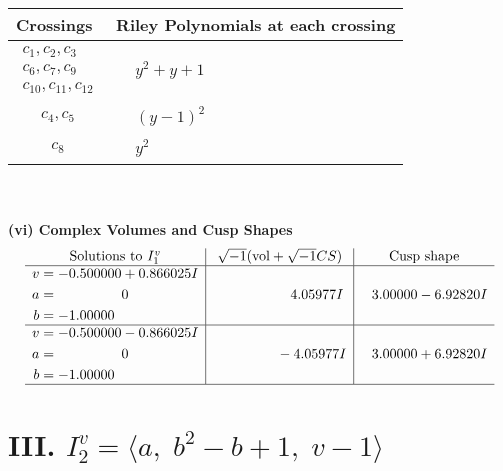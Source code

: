 \documentclass[1p]{elsarticle_modified}
\theoremstyle{definition}
\newcommand{\I}{\sqrt{-1}}
\begin{document}
\begin{tabular}{m{50pt}|m{274pt}}
Crossings & \hspace{64pt}Riley Polynomials at each crossing \\
\hline $$\begin{aligned}c_{1},c_{2},c_{3}\\c_{6},c_{7},c_{9}\\c_{10},c_{11},c_{12}\end{aligned}$$&$\begin{aligned}
&y^2+y+1
\end{aligned}$\\
\hline $$\begin{aligned}c_{4},c_{5}\end{aligned}$$&$\begin{aligned}
&(y-1)^2
\end{aligned}$\\
\hline $$\begin{aligned}c_{8}\end{aligned}$$&$\begin{aligned}
&y^2
\end{aligned}$\\
\hline
\end{tabular}\\~\\
\newpage\flushleft \textbf{(vi) Complex Volumes and Cusp Shapes}
$$\begin{array}{c|c|c}  
\text{Solutions to }I^v_{1}& \I (\text{vol} + \sqrt{-1}CS) & \text{Cusp shape}\\
 \hline 
\begin{aligned}
v &= -0.500000 + 0.866025 I \\
a &= \phantom{-0.000000 } 0 \\
b &= -1.00000\phantom{ +0.000000I}\end{aligned}
 & \phantom{-0.000000 -}4.05977 I & \phantom{-}3.00000 - 6.92820 I \\ \hline\begin{aligned}
v &= -0.500000 - 0.866025 I \\
a &= \phantom{-0.000000 } 0 \\
b &= -1.00000\phantom{ +0.000000I}\end{aligned}
 & \phantom{-0.000000 } -4.05977 I & \phantom{-}3.00000 + 6.92820 I\\
 \hline 
 \end{array}$$\newpage\newpage\renewcommand{\arraystretch}{1}
\centering \section*{III. $I^v_{2}= \langle a,\;b^2- b+1,\;v-1 \rangle$}
\end{document}
